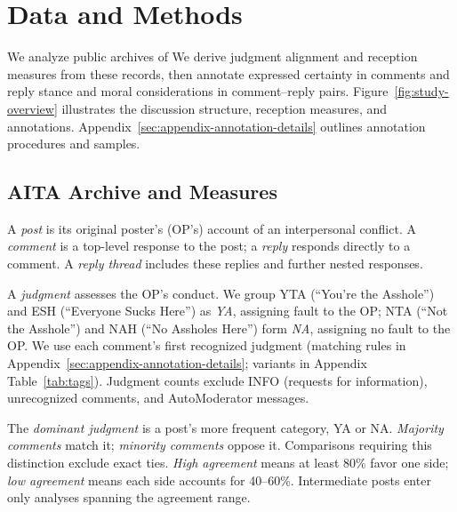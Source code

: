 \section{Data and Methods}
\label{sec:data-method}

We analyze public archives of%
We derive judgment alignment and reception measures from these records,
then annotate expressed certainty in comments and reply stance and moral
considerations in comment--reply pairs. Figure~\ref{fig:study-overview}
illustrates the discussion structure, reception measures, and annotations.
Appendix~\ref{sec:appendix-annotation-details} outlines annotation
procedures and samples.



\subsection{AITA Archive and Measures}
\label{subsec:dataset}

A \emph{post} is its original poster's (OP's) account of an interpersonal
conflict. A \emph{comment} is a top-level response to the post;
a \emph{reply} responds directly to a comment. A \emph{reply thread}
includes these replies and further nested responses.

A \emph{judgment} assesses the OP's conduct. We group YTA
(``You're the Asshole'') and ESH (``Everyone Sucks Here'') as \emph{YA},
assigning fault to the OP; NTA (``Not the Asshole'') and NAH
(``No Assholes Here'') form \emph{NA}, assigning no fault to the OP.
We use each comment's first recognized judgment
(matching rules in Appendix~\ref{sec:appendix-annotation-details};
variants in Appendix Table~\ref{tab:tags}).
Judgment counts exclude INFO (requests for information), unrecognized
comments, and AutoModerator messages. 

The \emph{dominant judgment} is a post's more frequent category, YA or NA.
\emph{Majority comments} match it; \emph{minority comments} oppose it.
Comparisons requiring this distinction exclude exact ties.
\emph{High agreement} means at least 80\% favor one side;
\emph{low agreement} means each side accounts for 40--60\%.
Intermediate posts enter only analyses spanning the agreement range.

